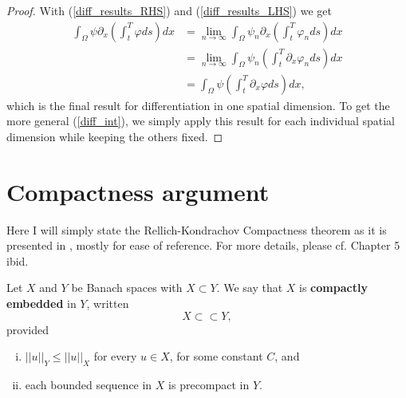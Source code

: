 \documentclass[11pt, a4paper]{article}
\begin{document}
\begin{appendix}
\begin{proof}
With (\ref{diff_results_RHS}) and (\ref{diff_results_LHS}) we get
\begin{align*}
\int_{\Omega}\psi \partial_x \left( \int_t^T\varphi ds \right)dx &= \lim_{n\to \infty}\int_{\Omega}\psi_n \partial_x \left( \int_t^T \varphi_n ds \right) dx \\
&= \lim_{n \to \infty} \int_\Omega \psi_n \left( \int_t^T \partial_x \varphi_n ds \right)dx \\
&= \int_\Omega \psi \left( \int_t^T \partial_x \varphi ds \right)dx,
\end{align*}
which is the final result for differentiation in one spatial dimension. To get the more general (\ref{diff_int}), we simply apply this result for each individual spatial dimension while keeping the others fixed.

\end{proof}


\newpage
\section{Compactness argument}
\label{sec:compactness}
Here I will simply state the Rellich-Kondrachov Compactness theorem as it is presented in \citep{evans}, mostly for ease of reference. For more details, please cf. Chapter 5 ibid.

\begin{mydef}
Let $X$ and $Y$ be Banach spaces with $X \subset Y$. We say that $X$ is \textbf{compactly embedded} in $Y$, written
\begin{equation*}
X \subset \subset Y,
\end{equation*}
provided 
\begin{enumerate}[i)]
	\item $||u||_Y \leq ||u||_X$ for every $u \in X$, for some constant $C$, and

	\item each bounded sequence in $X$ is precompact in $Y$.
\end{enumerate}
\end{mydef}


\end{appendix}
\end{document}

